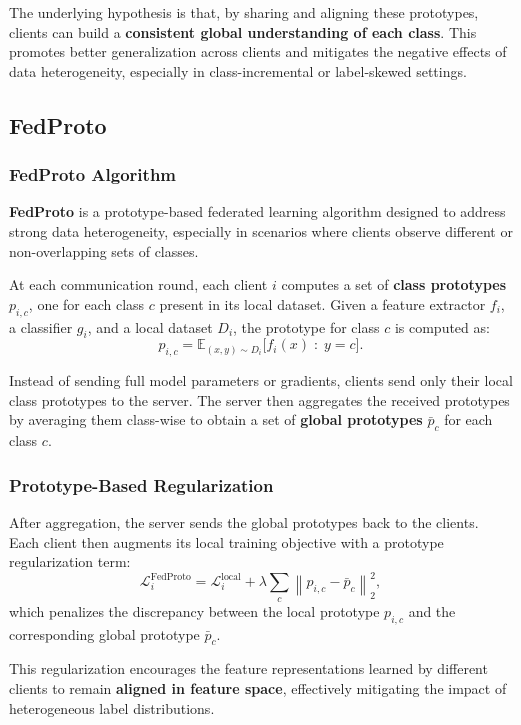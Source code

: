 The underlying hypothesis is that, by sharing and aligning these prototypes, clients can
build a \textbf{consistent global understanding of each class}. This promotes better
generalization across clients and mitigates the negative effects of data heterogeneity,
especially in class-incremental or label-skewed settings.

\subsection{FedProto}

\subsubsection{FedProto Algorithm}

\textbf{FedProto}  is a prototype-based federated learning algorithm designed
to address strong data heterogeneity, especially in scenarios where clients observe
different or non-overlapping sets of classes.

At each communication round, each client $i$ computes a set of \textbf{class prototypes}
$p_{i,c}$, one for each class $c$ present in its local dataset. Given a feature extractor
$f_i$, a classifier $g_i$, and a local dataset $D_i$, the prototype for class $c$ is computed
as:
\[
p_{i,c}
=
\mathbb{E}_{(x,y)\sim D_i}
\bigl[ f_i(x) \;:\; y = c \bigr].
\]

Instead of sending full model parameters or gradients, clients send only their local class
prototypes to the server. The server then aggregates the received prototypes by averaging
them class-wise to obtain a set of \textbf{global prototypes} $\bar{p}_c$ for each class $c$.

\subsubsection{Prototype-Based Regularization}

After aggregation, the server sends the global prototypes back to the clients. Each client
then augments its local training objective with a prototype regularization term:
\[
\mathcal{L}^{\text{FedProto}}_i
=
\mathcal{L}^{\text{local}}_i
+
\lambda
\sum_c
\left\|
p_{i,c} - \bar{p}_c
\right\|_2^2,
\]
which penalizes the discrepancy between the local prototype $p_{i,c}$ and the
corresponding global prototype $\bar{p}_c$.

This regularization encourages the feature representations learned by different clients to
remain \textbf{aligned in feature space}, effectively mitigating the impact of heterogeneous
label distributions.

